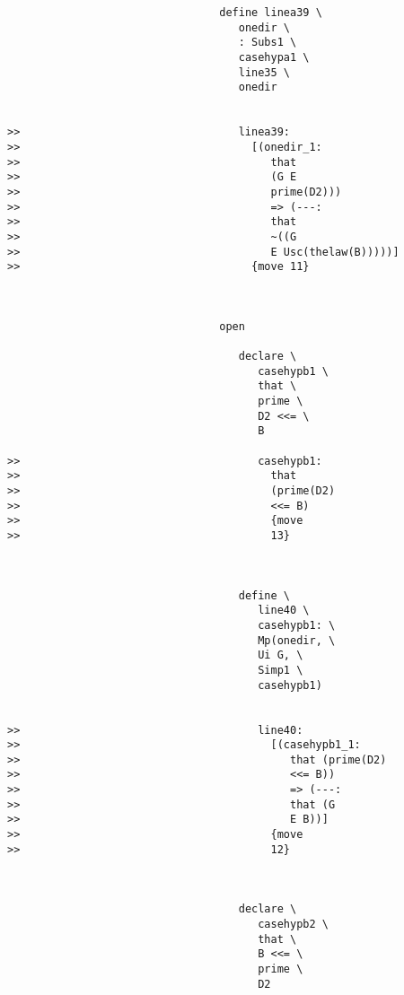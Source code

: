 \documentclass[12pt]{article}
\begin{document}
\begin{verbatim}
                                 define linea39 \
                                    onedir \
                                    : Subs1 \
                                    casehypa1 \
                                    line35 \
                                    onedir


>>                                  linea39:
>>                                    [(onedir_1:
>>                                       that
>>                                       (G E
>>                                       prime(D2)))
>>                                       => (---:
>>                                       that
>>                                       ~((G
>>                                       E Usc(thelaw(B)))))]
>>                                    {move 11}



                                 open

                                    declare \
                                       casehypb1 \
                                       that \
                                       prime \
                                       D2 <<= \
                                       B

>>                                     casehypb1:
>>                                       that
>>                                       (prime(D2)
>>                                       <<= B)
>>                                       {move
>>                                       13}



                                    define \
                                       line40 \
                                       casehypb1: \
                                       Mp(onedir, \
                                       Ui G, \
                                       Simp1 \
                                       casehypb1)


>>                                     line40:
>>                                       [(casehypb1_1:
>>                                          that (prime(D2)
>>                                          <<= B))
>>                                          => (---:
>>                                          that (G
>>                                          E B))]
>>                                       {move
>>                                       12}



                                    declare \
                                       casehypb2 \
                                       that \
                                       B <<= \
                                       prime \
                                       D2


\end{verbatim}
\end{document}
